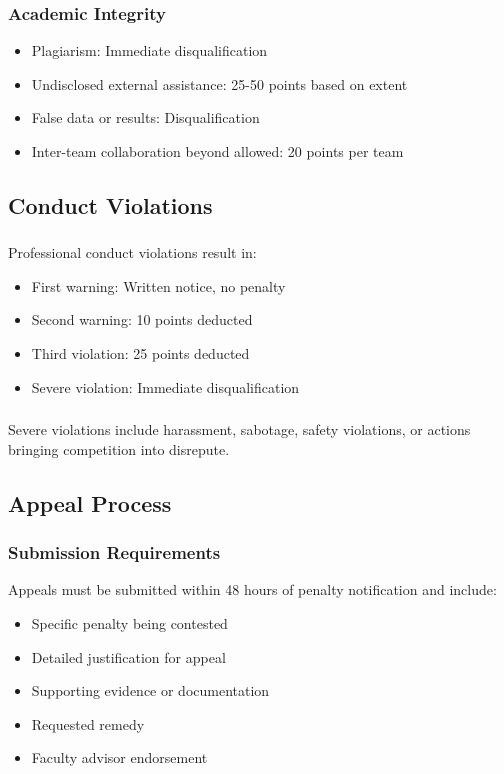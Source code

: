 \subsubsection{Academic Integrity}
\begin{itemize}[noitemsep]
    \item Plagiarism: Immediate disqualification
    \item Undisclosed external assistance: 25-50 points based on extent
    \item False data or results: Disqualification
    \item Inter-team collaboration beyond allowed: 20 points per team
\end{itemize}

\subsection{Conduct Violations}

\subsubsection{}
Professional conduct violations result in:
\begin{itemize}[noitemsep]
    \item First warning: Written notice, no penalty
    \item Second warning: 10 points deducted
    \item Third violation: 25 points deducted
    \item Severe violation: Immediate disqualification
\end{itemize}

\subsubsection{}
Severe violations include harassment, sabotage, safety violations, or actions bringing competition into disrepute.

\subsection{Appeal Process}

\subsubsection{Submission Requirements}
Appeals must be submitted within 48 hours of penalty notification and include:
\begin{itemize}[noitemsep]
    \item Specific penalty being contested
    \item Detailed justification for appeal
    \item Supporting evidence or documentation
    \item Requested remedy
    \item Faculty advisor endorsement
\end{itemize}

